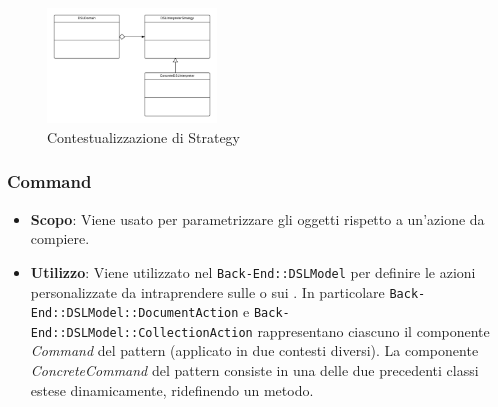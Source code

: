 \begin{figure}[H]
\centering \includegraphics[width=0.4\textwidth]{patterns/contestualizzazione/strategy.png}
\caption{Contestualizzazione di Strategy}
\label{fig:mvc}
\end{figure}

\subsubsection{Command}

\begin{itemize}

	\item \textbf{Scopo}: Viene usato per parametrizzare gli oggetti rispetto a un'azione da compiere.
	\item \textbf{Utilizzo}: Viene utilizzato nel  \texttt{Back-End::DSLModel} per definire le azioni personalizzate da intraprendere sulle  o sui . In particolare \texttt{Back-End::DSLModel::DocumentAction} e \texttt{Back-End::DSLModel::CollectionAction} rappresentano ciascuno il componente \textit{Command} del pattern (applicato in due contesti diversi). La componente \textit{ConcreteCommand} del pattern consiste in una delle due precedenti classi estese dinamicamente, ridefinendo un metodo.

\end{itemize}